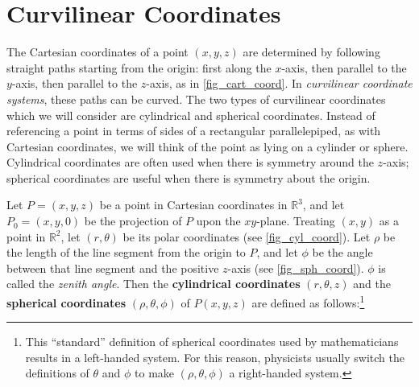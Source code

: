 \section{Curvilinear Coordinates}\label{sec:other_systems}



The Cartesian coordinates of a point $(x,y,z)$ are determined by following straight paths starting from the origin: first along the $x$-axis, then parallel to the $y$-axis, then parallel to the $z$-axis, as in \autoref{fig_cart_coord}. In \emph{curvilinear coordinate systems}, these paths can be curved. The two types of curvilinear coordinates which we will consider are cylindrical and spherical coordinates. Instead of referencing a point in terms of sides of a rectangular parallelepiped, as with Cartesian coordinates, we will think of the point as lying on a cylinder or sphere. Cylindrical coordinates are often used when there is symmetry around the $z$-axis; spherical coordinates are useful when there is symmetry about the origin.

Let $P = (x,y,z)$ be a point in Cartesian coordinates in $\mathbb{R}^{3}$, and let $P_0 = (x,y,0)$ be the projection of $P$ upon the $xy$-plane. Treating $(x,y)$ as a point in $\mathbb{R}^{2}$, let $(r,\theta)$ be its polar coordinates (see \autoref{fig_cyl_coord}). Let $\rho$ be the length of the line segment from the origin to $P$, and let $\phi$ be the angle between that line segment and the positive $z$-axis (see \autoref{fig_sph_coord}). $\phi$ is called the \emph{zenith angle}. Then the \textbf{cylindrical coordinates} $(r,\theta,z)$  and the \textbf{spherical coordinates} $(\rho,\theta,\phi)$ of $P(x,y,z)$ are defined as follows:\footnote{This ``standard'' definition of spherical coordinates used by mathematicians results in a left-handed system. For this reason, physicists usually switch the definitions of $\theta$ and $\phi$ to make $(\rho,\theta,\phi)$ a right-handed system.}




